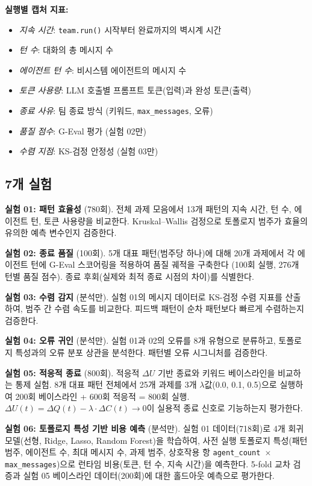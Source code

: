 \documentclass[a4paper,11pt]{article}
\begin{document}
\textbf{실행별 캡처 지표:}
\begin{itemize}
    \item \emph{지속 시간}: \texttt{team.run()} 시작부터 완료까지의 벽시계 시간
    \item \emph{턴 수}: 대화의 총 메시지 수
    \item \emph{에이전트 턴 수}: 비시스템 에이전트의 메시지 수
    \item \emph{토큰 사용량}: LLM 호출별 프롬프트 토큰(입력)과 완성 토큰(출력)
    \item \emph{종료 사유}: 팀 종료 방식 (키워드, \texttt{max\_messages}, 오류)
    \item \emph{품질 점수}: G-Eval 평가 (실험 02만)
    \item \emph{수렴 지점}: KS-검정 안정성 (실험 03만)
\end{itemize}

\subsection{7개 실험}

\textbf{실험 01: 패턴 효율성} (780회). 전체 과제 모음에서 13개 패턴의 지속 시간, 턴 수, 에이전트 턴, 토큰 사용량을 비교한다. Kruskal--Wallis 검정으로 토폴로지 범주가 효율의 유의한 예측 변수인지 검증한다.

\textbf{실험 02: 종료 품질} (100회). 5개 대표 패턴(범주당 하나)에 대해 20개 과제에서 각 에이전트 턴에 G-Eval 스코어링을 적용하여 품질 궤적을 구축한다 (100회 실행, 276개 턴별 품질 점수). 종료 후회(실제와 최적 종료 시점의 차이)를 식별한다.

\textbf{실험 03: 수렴 감지} (분석만). 실험 01의 메시지 데이터로 KS-검정 수렴 지표를 산출하여, 범주 간 수렴 속도를 비교한다. 피드백 패턴이 순차 패턴보다 빠르게 수렴하는지 검증한다.

\textbf{실험 04: 오류 귀인} (분석만). 실험 01과 02의 오류를 8개 유형으로 분류하고, 토폴로지 특성과의 오류 분포 상관을 분석한다. 패턴별 오류 시그니처를 검증한다.

\textbf{실험 05: 적응적 종료} (800회). 적응적 $\Delta U$ 기반 종료와 키워드 베이스라인을 비교하는 통제 실험. 8개 대표 패턴 전체에서 25개 과제를 3개 $\lambda$값(0.0, 0.1, 0.5)으로 실행하여 200회 베이스라인 + 600회 적응적 = 800회 실행. $\Delta U(t) = \Delta Q(t) - \lambda \cdot \Delta C(t) \to 0$이 실용적 종료 신호로 기능하는지 평가한다.

\textbf{실험 06: 토폴로지 특성 기반 비용 예측} (분석만). 실험 01 데이터(718회)로 4개 회귀 모델(선형, Ridge, Lasso, Random Forest)을 학습하여, 사전 실행 토폴로지 특성(패턴 범주, 에이전트 수, 최대 메시지 수, 과제 범주, 상호작용 항 \texttt{agent\_count $\times$ max\_messages})으로 런타임 비용(토큰, 턴 수, 지속 시간)을 예측한다. 5-fold 교차 검증과 실험 05 베이스라인 데이터(200회)에 대한 홀드아웃 예측으로 평가한다.
\end{document}
